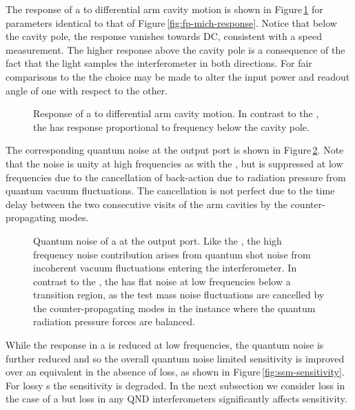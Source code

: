 The response of a \SSM{} to differential arm cavity motion is shown in Figure\,\ref{fig:ssm-response} for parameters identical to that of Figure\,\ref{fig:fp-mich-response}. Notice that below the cavity pole, the response vanishes towards \gls{DC}, consistent with a speed measurement. The higher response above the cavity pole is a consequence of the fact that the light samples the interferometer in both directions. For fair comparisons to the \MI{} the choice may be made to alter the input power and readout angle of one with respect to the other.

\begin{figure}
  \centering
  
  \caption[Response of a \SSM{} to differential arm cavity motion]{\label{fig:ssm-response}Response of a \SSM{} to differential arm cavity motion. In contrast to the \MI{}, the \SSM{} has response proportional to frequency below the cavity pole.}
\end{figure}

The corresponding quantum noise at the output port is shown in Figure\,\ref{fig:ssm-noise}. Note that the noise is unity at high frequencies as with the \FPMI{}, but is suppressed at low frequencies due to the cancellation of back-action due to radiation pressure from quantum vacuum fluctuations. The cancellation is not perfect due to the time delay between the two consecutive visits of the arm cavities by the counter-propagating modes.

\begin{figure}
  \centering
  
  \caption[Quantum noise of a \SSM{} at the output port]{\label{fig:ssm-noise}Quantum noise of a \SSM{} at the output port. Like the \MI{}, the high frequency noise contribution arises from quantum shot noise from incoherent vacuum fluctuations entering the interferometer. In contrast to the \MI{}, the \SSM{} has flat noise at low frequencies below a transition region, as the test mass noise fluctuations are cancelled by the counter-propagating modes in the instance where the quantum radiation pressure forces are balanced.}
\end{figure}

While the response in a \SSM{} is reduced at low frequencies, the quantum noise is further reduced and so the overall quantum noise limited sensitivity is improved over an equivalent \FPMI{} in the absence of loss, as shown in Figure\,\ref{fig:ssm-sensitivity}. For lossy \SM{}s the sensitivity is degraded. In the next subsection we consider loss in the case of a \SSM{} but loss in any \gls{QND} interferometers significantly affects sensitivity.

